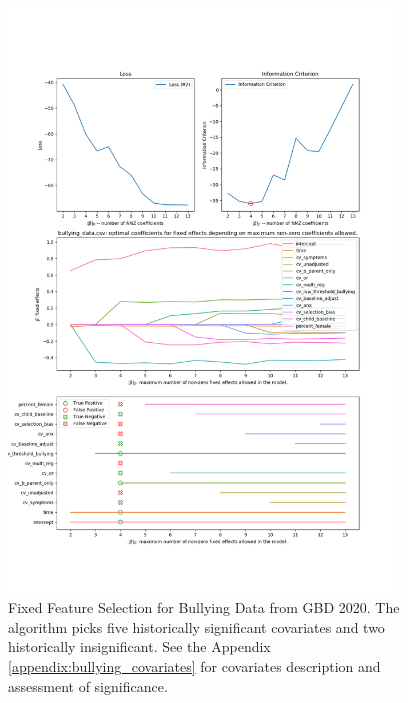 \documentclass[11pt,letterpaper]{article}
\numberwithin{equation}{section} %
\numberwithin{figure}{section} %
\numberwithin{table}{section} %
\begin{document}
\begin{figure}
	\caption{\label{fig:bullying_data_fixed_feature_selection}Fixed Feature Selection for Bullying Data from GBD 2020. The algorithm picks five historically significant covariates and two historically insignificant. See the Appendix \ref{appendix:bullying_covariates} for covariates description and assessment of significance. }
	\includegraphics[width=0.92\textwidth]{Images/bullying_data.csv_fixed_feature_selection}
\end{figure}
\end{document}

